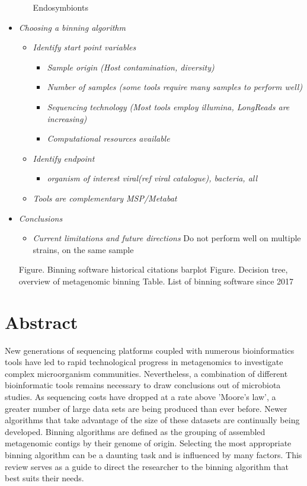\documentclass{article}
\begin{document}
\begin{itemize}
\begin{itemize}
                 Endosymbionts 
           \end{itemize}     
 \item\emph{Choosing a binning algorithm} 
         \begin{itemize}
	  \item\emph{Identify start point variables} 
          	\begin{itemize}
      			\item\emph{Sample origin (Host contamination, diversity)} 
                	 \item\emph{Number of samples (some tools require many samples to perform well)} 
                	 \item\emph{Sequencing technology (Most tools employ illumina, LongReads are increasing) }
                	 \item\emph{Computational resources available }
		\end{itemize}
         \item\emph{Identify endpoint} 
		\begin{itemize}
			\item\emph{organism of interest viral(ref viral catalogue), bacteria, all} 
          	\end{itemize}       
         \item\emph{Tools are complementary MSP/Metabat} 
         \end{itemize} 
 \item\emph{Conclusions} 
         	\begin{itemize}
		\item\emph{Current limitations and future directions} 
                 Do not perform well on multiple strains, on the same sample 
 		\end{itemize}
 Figure. Binning software historical citations barplot 
 Figure. Decision tree, overview of metagenomic binning 
 Table. List of binning software since 2017                  
\end{itemize}

\section*{Abstract}
New generations of sequencing platforms coupled with numerous bioinformatics tools have led to rapid technological progress in metagenomics to investigate complex microorganism communities.
Nevertheless, a combination of different bioinformatic tools remains necessary to draw conclusions out of microbiota studies.
As sequencing costs have dropped at a rate above 'Moore's law', a greater number of large data sets are being produced than ever before.
Newer algorithms that take advantage of the size of these datasets are continually being developed.
Binning algorithms are defined as the grouping of assembled metagenomic contigs by their genome of origin.
Selecting the most appropriate binning algorithm can be a daunting task and is influenced by many factors.
This review serves as a guide to direct the researcher to the binning algorithm that best suits their needs.
\end{document}
